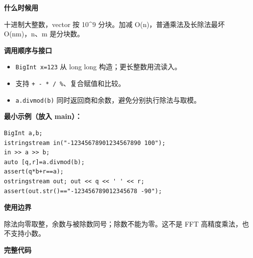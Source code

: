 \documentclass[UTF8,a4paper,10pt]{ctexart}
\newcommand{\TemplUsage}[1]{\textbf{什么时候用}\par #1\par}
\newcommand{\TemplApi}[1]{\textbf{调用顺序与接口}\par #1\par}
\newcommand{\TemplNote}[1]{\textbf{使用边界}\par #1\par}
\begin{document}
\TemplUsage{十进制大整数，vector 按 10\textasciicircum{}9 分块。加减 O(n)，普通乘法及长除法最坏 O(nm)，n、m 是分块数。}
\TemplApi{\begin{itemize}
\item \texttt{BigInt x=123} 从 long long 构造；更长整数用流读入。
\item 支持 \texttt{+ - * / \%}、复合赋值和比较。
\item \texttt{a.divmod(b)} 同时返回商和余数，避免分别执行除法与取模。
\end{itemize}}
\textbf{最小示例（放入 main）：}
\begin{lstlisting}
BigInt a,b;
istringstream in("-12345678901234567890 100");
in >> a >> b;
auto [q,r]=a.divmod(b);
assert(q*b+r==a);
ostringstream out; out << q << ' ' << r;
assert(out.str()=="-123456789012345678 -90");
\end{lstlisting}
\TemplNote{除法向零取整，余数与被除数同号；除数不能为零。这不是 FFT 高精度乘法，也不支持小数。}
\textbf{完整代码}
\end{document}
